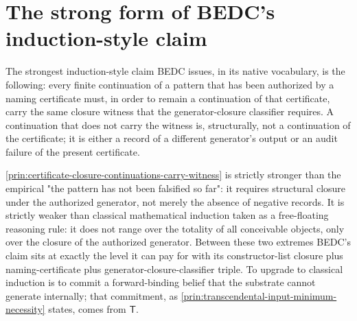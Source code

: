 \section{The strong form of BEDC's induction-style claim}
\label{sec:certificate-closure-strong-claim}

\begin{principle}
\label{prin:certificate-closure-continuations-carry-witness}
The strongest induction-style claim BEDC issues, in its native vocabulary, is the following: every finite continuation of a pattern that has been authorized by a naming certificate must, in order to remain a continuation of that certificate, carry the same closure witness that the generator-closure classifier requires. A continuation that does not carry the witness is, structurally, not a continuation of the certificate; it is either a record of a different generator's output or an audit failure of the present certificate.
\end{principle}

\begin{remark}
\label{rem:certificate-closure-stronger-than-empirical-weaker-than-classical}
\autoref{prin:certificate-closure-continuations-carry-witness} is strictly stronger than the empirical "the pattern has not been falsified so far": it requires structural closure under the authorized generator, not merely the absence of negative records. It is strictly weaker than classical mathematical induction taken as a free-floating reasoning rule: it does not range over the totality of all conceivable objects, only over the closure of the authorized generator. Between these two extremes BEDC's claim sits at exactly the level it can pay for with its constructor-list closure plus naming-certificate plus generator-closure-classifier triple. To upgrade to classical induction is to commit a forward-binding belief that the substrate cannot generate internally; that commitment, as \autoref{prin:transcendental-input-minimum-necessity} states, comes from $\mathsf{T}$.
\end{remark}


